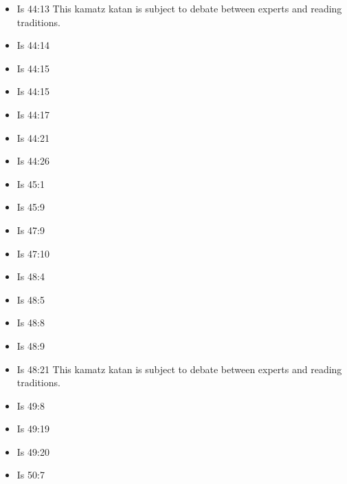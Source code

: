 \documentclass[14pt]{book}
\begin{document}
\begin{multicols}{2}
\begin{itemize}
		\item Is 44:13 This kamatz katan is subject to debate between experts and reading traditions.
		
		\item Is 44:14
		
		\item Is 44:15
		
		\item Is 44:15
		
		\item Is 44:17
				
				\item Is 44:21
				
				\item Is 44:26
				
				\item Is 45:1
				
				\item Is 45:9
				
				\item Is 47:9
				
				\item Is 47:10
				
				\item Is 48:4
				
				\item Is 48:5
				
				\item Is 48:8
				
				\item Is 48:9
				
				\item Is 48:21 This kamatz katan is subject to debate between experts and reading traditions.
				
				\item Is 49:8
				
				\item Is 49:19
				
				\item Is 49:20
				
				\item Is 50:7
				

\end{itemize}
\end{multicols}
\end{document}
